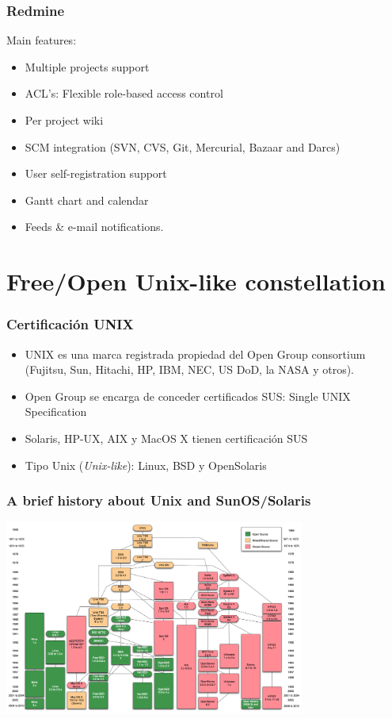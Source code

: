 \documentclass{beamer}
\begin{document}

\begin{frame}
\frametitle{Redmine}

Main features:
\begin{itemize}
\item Multiple projects support
\item ACL's: Flexible role-based access control
\item Per project wiki 
\item SCM integration (SVN, CVS, Git, Mercurial, Bazaar and Darcs)
\item User self-registration support
\item Gantt chart and calendar
\item Feeds \& e-mail notifications.
\end{itemize}
\end{frame}


\section{Free/Open Unix-like constellation}

\begin{frame}
\frametitle{Certificación UNIX}

\begin{itemize}
\item \textsc{UNIX}\texttrademark{} es una marca registrada propiedad del Open Group consortium (Fujitsu, Sun, Hitachi, HP, IBM, NEC, US DoD, la NASA y otros). 
\item Open Group se encarga de conceder certificados SUS: Single UNIX Specification 
\item Solaris, HP-UX, AIX y MacOS X tienen certificación SUS
\item Tipo Unix (\textit{Unix-like}): Linux, BSD y OpenSolaris
\end{itemize}
\end{frame}



\begin{frame}
\frametitle{A brief history about Unix and SunOS/Solaris}
\begin{center}
  \includegraphics[height=2.5in]{figs/Unix_history-simple.png}
\end{center}
\end{frame}
\end{document}
